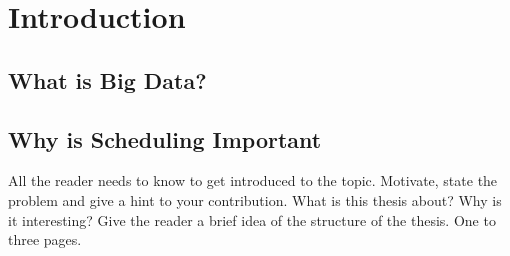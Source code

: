 \chapter{Introduction}
\section{What is Big Data?}

\section{Why is Scheduling Important}



All the reader needs to know to get introduced to the topic. Motivate, state the problem and give a hint to your contribution. What is this thesis about? Why is it interesting? Give the reader a brief idea of the structure of the thesis. One to three pages.